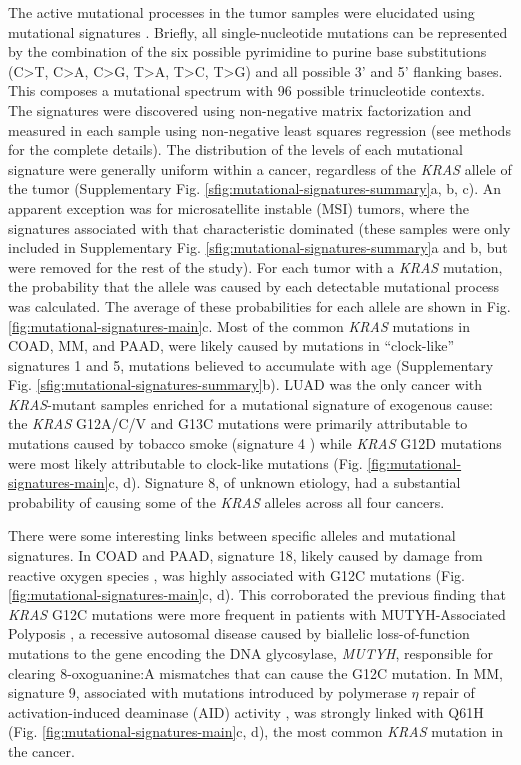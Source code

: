\documentclass[english, 10pt, letterpaper]{article}
\newcommand{\KRAS}{\emph{KRAS}}
\begin{document}
The active mutational processes in the tumor samples were elucidated using mutational signatures \cite{Alexandrov2013}. 
Briefly, all single-nucleotide mutations can be represented by the combination of the six possible pyrimidine to purine base substitutions (C>T, C>A, C>G, T>A, T>C, T>G) and all possible 3’ and 5’ flanking bases. 
This composes a mutational spectrum with 96 possible trinucleotide contexts. 
The signatures were discovered using non-negative matrix factorization and measured in each sample using non-negative least squares regression (see methods for the complete details). 
The distribution of the levels of each mutational signature were generally uniform within a cancer, regardless of the \KRAS{} allele of the tumor (Supplementary Fig. \ref{sfig:mutational-signatures-summary}a, b, c). 
An apparent exception was for microsatellite instable (MSI) tumors, where the signatures associated with that characteristic dominated (these samples were only included in Supplementary Fig. \ref{sfig:mutational-signatures-summary}a and b, but were removed for the rest of the study). 
For each tumor with a \KRAS{} mutation, the probability that the allele was caused by each detectable mutational process was calculated. 
The average of these probabilities for each allele are shown in Fig. \ref{fig:mutational-signatures-main}c. 
Most of the common \KRAS{} mutations in COAD, MM, and PAAD, were likely caused by mutations in “clock-like” signatures 1 and 5, mutations believed to accumulate with age \cite{Alexandrov2015} (Supplementary Fig. \ref{sfig:mutational-signatures-summary}b). 
LUAD was the only cancer with \KRAS{}-mutant samples enriched for a mutational signature of exogenous cause: the \KRAS{} G12A/C/V and G13C mutations were primarily attributable to mutations caused by tobacco smoke (signature 4 \cite{Alexandrov2016}) while \KRAS{} G12D mutations were most likely attributable to clock-like mutations (Fig. \ref{fig:mutational-signatures-main}c, d).
Signature 8, of unknown etiology, had a substantial probability of causing some of the \KRAS{} alleles across all four cancers.

There were some interesting links between specific alleles and mutational signatures.
In COAD and PAAD, signature 18, likely caused by damage from reactive oxygen species \cite{Viel2017, Pilati2017}, was highly associated with G12C mutations (Fig. \ref{fig:mutational-signatures-main}c, d).
This corroborated the previous finding that \KRAS{} G12C mutations were more frequent in patients with MUTYH-Associated Polyposis \cite{Viel2017}, a recessive autosomal disease caused by biallelic loss-of-function mutations to the gene encoding the DNA glycosylase, \emph{MUTYH}, responsible for clearing 8-oxoguanine:A mismatches that can cause the G12C mutation.
In MM, signature 9, associated with mutations introduced by polymerase $\eta$ repair of activation-induced deaminase (AID) activity \cite{Alexandrov2013, Rogozin2018DNACancer., Petljak2016UnderstandingCancer.}, was strongly linked with Q61H (Fig. \ref{fig:mutational-signatures-main}c, d), the most common \KRAS{} mutation in the cancer.
\end{document}
